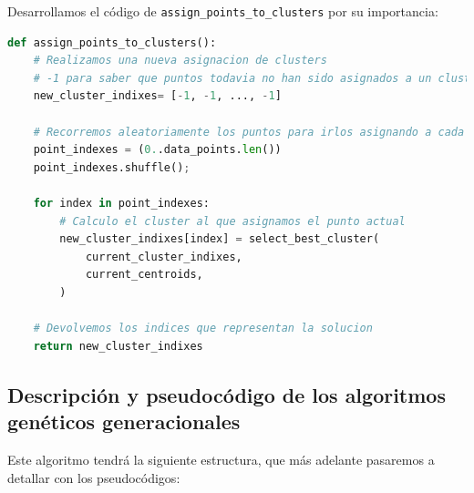 \documentclass[11pt]{article}
\begin{document}
Desarrollamos el código de \lstinline{assign_points_to_clusters} por su importancia:

\begin{lstlisting}[language=Python, style=Boxed]
def assign_points_to_clusters():
    # Realizamos una nueva asignacion de clusters
    # -1 para saber que puntos todavia no han sido asignados a un cluster
    new_cluster_indixes= [-1, -1, ..., -1]

    # Recorremos aleatoriamente los puntos para irlos asignando a cada cluster
    point_indexes = (0..data_points.len())
    point_indexes.shuffle();

    for index in point_indexes:
        # Calculo el cluster al que asignamos el punto actual
        new_cluster_indixes[index] = select_best_cluster(
            current_cluster_indixes,
            current_centroids,
        )

    # Devolvemos los indices que representan la solucion
    return new_cluster_indixes
\end{lstlisting}

\pagebreak

\subsection{Descripción y pseudocódigo de los algoritmos genéticos generacionales}

Este algoritmo tendrá la siguiente estructura, que más adelante pasaremos a detallar con los pseudocódigos:
\end{document}
